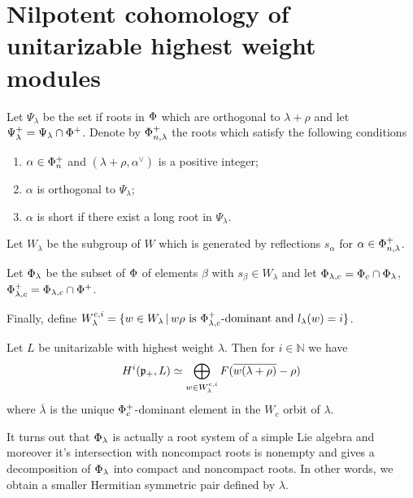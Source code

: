 \documentclass[12pt,a4paper,final]{report}
\begin{document}
\section{Nilpotent cohomology of unitarizable highest weight modules}


\begin{definition}\label{def:cohomology_roots}
Let $\Psi_\lambda$ be the set if roots in $\Phi$ which are orthogonal to $\lambda+\rho$ and let $\Psi_\lambda^+ = \Psi_\lambda \cap \Phi^+$. Denote by $\Phi_{n,\lambda}^+$ the roots which satisfy the following conditions
 \begin{enumerate}
    \item $\alpha \in \Phi_n^+$ and $(\lambda+\rho,\alpha^\vee)$ is a positive integer;
    \item $\alpha$ is orthogonal to $\Psi_\lambda$;
    \item $\alpha$ is short if there exist a long root in $\Psi_\lambda$.
 \end{enumerate}
 
 Let $W_\lambda$ be the subgroup of $W$ which is generated by reflections $s_\alpha$ for $\alpha\in \Phi_{n,\lambda}^+$.
 
 Let $\Phi_\lambda$ be the subset of $\Phi$ of elements $\beta$ with $s_\beta\in W_\lambda$ and let $\Phi_{\lambda,c} = \Phi_c \cap \Phi_\lambda$, $\Phi_{\lambda,c}^+ = \Phi_{\lambda,c} \cap \Phi^+$.
 
 Finally, define  $W^{c,i}_\lambda = \{ w \in W_\lambda \, |\, w \rho \text{ is } \Phi^+_{\lambda, c}\text{-dominant and } l_\lambda(w)=i \}$.
\end{definition}

\begin{theorem}\label{thm:cohomology}
 Let $L$ be unitarizable with highest weight $\lambda $. Then for $i\in \mathbb{N}$ we have
\begin{equation}\label{eq:cohomology}
 H^i(\mathfrak{p}_+,L)\simeq \bigoplus_{w\in W^{c,i}_\lambda} F(\overline{w(\lambda+\rho)} - \rho)
\end{equation}
where  $\overline{\lambda}$ is the unique $\Phi_c^+$-dominant element in the $W_c$ orbit of $\lambda$.
\end{theorem}

It turns out that $\Phi_\lambda$ is actually a root system of a simple Lie algebra and moreover it's intersection with noncompact roots is nonempty and gives a decomposition of $\Phi_\lambda$ into compact and noncompact roots. In other words, we obtain a smaller Hermitian symmetric pair defined by $\lambda$.
\end{document}
